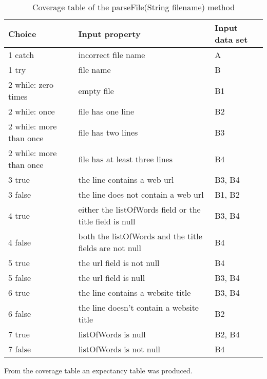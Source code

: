 \begin{table}[!h]
    \caption{Coverage table of the parseFile(String filename) method}
    \begin{tabular}{|l|p{100pt}|l|}
        \hline
        \textbf{Choice} & \textbf{Input property} & \textbf{Input data set} \\ \hline
        1 catch & incorrect file name & A \\ \hline
        1 try & file name & B \\ \hline
        2 while: zero times & empty file & B1 \\ \hline
        2 while: once & file has one line & B2 \\ \hline
        2 while: more than once & file has two lines & B3 \\ \hline
        2 while: more than once & file has at least three lines & B4 \\ \hline
        3 true & the line contains a web url & B3, B4 \\ \hline
        3 false & the line does not contain a web url & B1, B2 \\ \hline
        4 true & either the listOfWords field or the title field is null & B3, B4 \\ \hline
        4 false & both the listOfWords and the title fields are not null & B4 \\ \hline
        5 true & the url field is not null & B4 \\ \hline
        5 false & the url field is null & B3, B4 \\ \hline
        6 true & the line contains a website title & B3, B4 \\ \hline
        6 false & the line doesn't contain a website title & B2 \\ \hline
        7 true & listOfWords is null & B2, B4 \\ \hline
        7 false & listOfWords is not null & B4 \\ \hline
    \end{tabular}
\end{table}

From the coverage table an expectancy table was produced.

